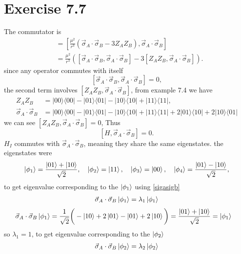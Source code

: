 \documentclass{article}
\newcommand{\op}[2]{|#1\rangle \langle#2|}
\begin{document}
\section*{Exercise 7.7}
The commutator is
\begin{align*}    
[H_{I}, \vec{\sigma}_A \cdot \vec{\sigma}_B] &= \left[ \frac{\mu^2}{r^3} \left( \vec{\sigma}_A \cdot \vec{\sigma}_B - 3 Z_A Z_B \right), \vec{\sigma}_A \cdot \vec{\sigma}_B \right] \\
&= \frac{\mu^2}{r^3} \left( [\vec{\sigma}_A \cdot \vec{\sigma}_B, \vec{\sigma}_A \cdot \vec{\sigma}_B] - 3 [Z_A Z_B, \vec{\sigma}_A \cdot \vec{\sigma}_B] \right).
\end{align*}
since any operator commutes with itself
\[
[\vec{\sigma}_A \cdot \vec{\sigma}_B, \vec{\sigma}_A \cdot \vec{\sigma}_B] = 0,
\]
the second term involves \( [Z_A Z_B, \vec{\sigma}_A \cdot \vec{\sigma}_B] \), from example 7.4 we have
\begin{align}
    Z_A Z_B &= \op{00}{00} - \op{01}{01} - \op{10}{10} + \op{11}{11},\nonumber\\
    \vec{\sigma}_A \cdot \vec{\sigma}_B &= \op{00}{00} - \op{01}{01} - \op{10}{10} + \op{11}{11} + 2\op{01}{10} + 2\op{10}{01} \label{sigasigb}
\end{align}
we can see \( [Z_A Z_B, \vec{\sigma}_A \cdot \vec{\sigma}_B] = 0 \), Thus
\[
[H, \vec{\sigma}_A \cdot \vec{\sigma}_B] = 0.
\]
\( H_{I} \) commutes with \( \vec{\sigma}_A \cdot \vec{\sigma}_B \), meaning they share the same eigenstates.
the eigenstates were
\begin{align*}
    \ket{\phi_{1}} = \frac{\ket{01}+\ket{10}}{\sqrt{2}},\quad \ket{\phi_2} = \ket{11},\quad \ket{\phi_3} = \ket{00},\quad \ket{\phi_4} = \frac{\ket{01}-\ket{10}}{\sqrt{2}},
\end{align*}
to get eigenvalue corresponding to the $\ket{\phi_1}$ using \ref{sigasigb}
\begin{align*}
    \vec{\sigma}_A \cdot \vec{\sigma}_B \ket{\phi_{1}} = \lambda_{1} \ket{\phi_{1}}
\end{align*}
\begin{align*}
    \vec{\sigma}_A \cdot \vec{\sigma}_B \ket{\phi_{1}} = \frac{1}{\sqrt{2}}\bigg(-\ket{10}+2\ket{01}-\ket{01}+2\ket{10}\bigg) =  \frac{\ket{01}+\ket{10}}{\sqrt{2}} & = \ket{\phi_{1}} 
\end{align*}
so $\lambda_1=1$, 
to get eigenvalue corresponding to the $\ket{\phi_2}$
\begin{align*}
    \vec{\sigma}_A \cdot \vec{\sigma}_B \ket{\phi_{2}} = \lambda_{2} \ket{\phi_{2}}
\end{align*}
\end{document}

